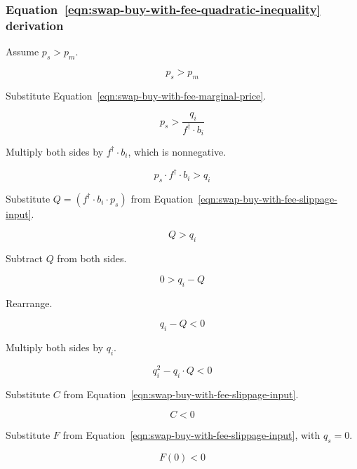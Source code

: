 \subsubsection{Equation~\ref{eqn:swap-buy-with-fee-quadratic-inequality} derivation}%
\label{sssec:equation-eqn-swap-buy-with-fee-quadratic-inequality-derivation}

Assume $p_s > p_m$.

\begin{equation*}
	p_s > p_m
\end{equation*}

Substitute Equation~\ref{eqn:swap-buy-with-fee-marginal-price}.

\begin{equation*}
	p_s > \frac{q_i}{f^{\dagger} \cdot b_i}
\end{equation*}

Multiply both sides by $f^{\dagger} \cdot b_i$, which is nonnegative.

\begin{equation*}
	p_s \cdot f^{\dagger} \cdot b_i > q_i
\end{equation*}

Substitute $Q = (f^{\dagger} \cdot b_i \cdot p_s)$ from
Equation~\ref{eqn:swap-buy-with-fee-slippage-input}.

\begin{equation*}
	Q > q_i
\end{equation*}

Subtract $Q$ from both sides.

\begin{equation*}
	0 > q_i - Q
\end{equation*}

Rearrange.

\begin{equation*}
	q_i - Q < 0
\end{equation*}

Multiply both sides by $q_i$.

\begin{equation*}
	q_i^2 -  q_i \cdot Q < 0
\end{equation*}

Substitute $C$ from Equation~\ref{eqn:swap-buy-with-fee-slippage-input}.

\begin{equation*}
	C < 0
\end{equation*}

Substitute $F$ from Equation~\ref{eqn:swap-buy-with-fee-slippage-input}, with $q_s = 0$.

\begin{equation*}
	F(0) < 0
\end{equation*}
